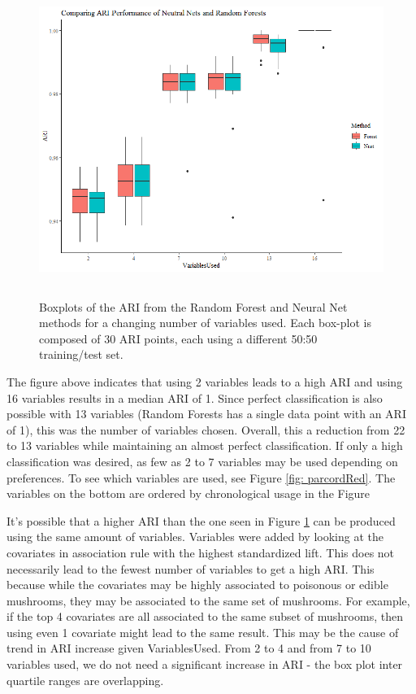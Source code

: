 \documentclass[float=false, crop=false]{standalone}
\begin{document}
\begin{figure}[H]
		\includegraphics[width=\textwidth, height=4in]{images/boxari.png}
		\caption{Boxplots of the ARI from the Random Forest and Neural Net methods for a changing number of variables used. Each box-plot is composed of 30 ARI points, each using a different 50:50 training/test set.}
		 \label{fig: boxAriRed}
\end{figure}

The figure above indicates that using 2 variables leads to a high ARI and using 16 variables results in a median ARI of 1. Since perfect classification is also possible with 13 variables (Random Forests has a single data point with an ARI of 1), this was the number of variables chosen. Overall, this a reduction from 22 to 13 variables while maintaining an almost perfect classification. If only a high classification was desired, as few as 2 to 7 variables may be used depending on preferences. To see which variables are used, see Figure \ref{fig: parcordRed}. The variables on the bottom are ordered by chronological usage in the Figure 

It's possible that a higher ARI than the one seen in Figure \ref{fig: boxAriRed} can be produced using the same amount of variables. Variables were added by looking at the covariates in association rule with the highest standardized lift. This does not necessarily lead to the fewest number of variables to get a high ARI. This because while the covariates may be highly associated to poisonous or edible mushrooms, they may be associated to the same set of mushrooms. For example, if the top 4 covariates are all associated to the same subset of mushrooms, then using even 1 covariate might lead to the same result. This may be the cause of trend in ARI increase given VariablesUsed. From 2 to 4 and from 7 to 10 variables used, we do not need a significant increase in ARI - the box plot inter quartile ranges are overlapping. 
\end{document}
